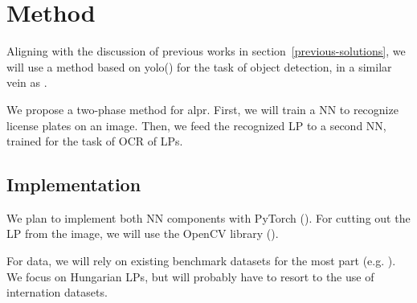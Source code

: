 \section{Method}
\label{method}


Aligning with the discussion of previous works in
section~\ref{previous-solutions}, we will use
a method based on \ac{yolo}(\cite{redmon2016look}) for the task of object
detection, in a similar vein as \cite{DBLP:journals/corr/abs-1909-01754}. 

We propose a two-phase method for \ac{alpr}. First, we will train a \ac{NN} to
recognize license plates on an image. Then, we feed the recognized \ac{LP} to
a second \ac{NN}, trained for the task of \ac{OCR} of \ac{LP}s.

\subsection{Implementation}
We plan to implement both \ac{NN} components with PyTorch (\cite{pytorch}).
For cutting out the \ac{LP} from the image, we will use the OpenCV library
(\cite{opencv}).

For data, we will rely on existing benchmark datasets for the most part (e.g.
\cite{DBLP:journals/corr/GoncalvesSMS16}). We focus on Hungarian \ac{LP}s, but
will probably have to resort to the use of internation datasets.
